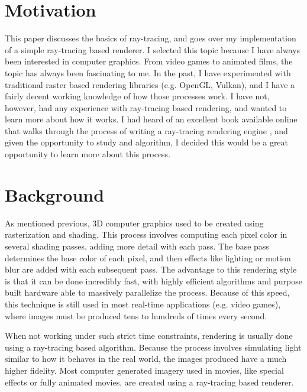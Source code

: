 \documentclass[10pt]{IEEEtran}
\begin{document}
\section*{Motivation}

This paper discusses the basics of ray-tracing, and goes over my implementation of a simple
ray-tracing based renderer. I selected this topic because I have always been interested in computer
graphics. From video games to animated films, the topic has always been fascinating to me. In the
past, I have experimented with traditional raster based rendering libraries (e.g. OpenGL, Vulkan),
and I have a fairly decent working knowledge of how those processes work. I have not, however, had
any experience with ray-tracing based rendering, and wanted to learn more about how it works. I had
heard of an excellent book available online that walks through the process of writing a ray-tracing
rendering engine \cite{Shirley2020RTW1}, and given the opportunity to study and algorithm, I decided
this would be a great opportunity to learn more about this process.

\section*{Background}

As mentioned previous, 3D computer graphics used to be created using rasterization and shading. This
process involves computing each pixel color in several shading passes, adding more detail with each
pass. The base pass determines the base color of each pixel, and then effects like lighting or
motion blur are added with each subsequent pass. The advantage to this rendering style is that it
can be done incredibly fast, with highly efficient algorithms and purpose built hardware able to
massively parallelize the process. Because of this speed, this technique is still used in most
real-time applications (e.g. video games), where images must be produced tens to hundreds of times
every second.

When not working under such strict time constraints, rendering is usually done using a ray-tracing
based algorithm. Because the process involves simulating light similar to how it behaves in the real
world, the images produced have a much higher fidelity. Most computer generated imagery used in
movies, like special effects or fully animated movies, are created using a ray-tracing based
renderer.
\end{document}
